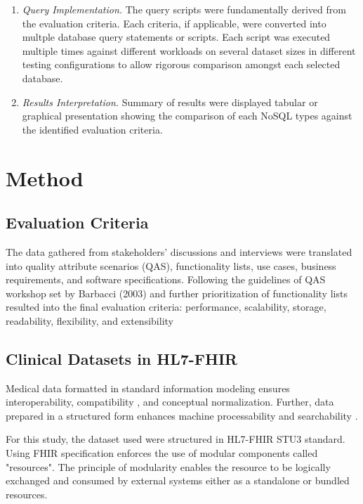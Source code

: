 \documentclass[5p]{elsarticle}
\begin{document}
\begin{enumerate}
\item \emph{Query Implementation.} 
The query scripts were fundamentally derived from the evaluation criteria. 
Each criteria, if applicable, were converted into multple database query statements or scripts.
Each script was executed multiple times against different workloads on several dataset sizes in different testing configurations to allow rigorous comparison amongst each selected database.

\item \emph{Results Interpretation.} 
Summary of results were displayed tabular or graphical presentation showing the comparison of each NoSQL types against the identified evaluation criteria.
\end{enumerate}

\section{Method}

\subsection{Evaluation Criteria}

The data gathered from stakeholders' discussions and interviews were translated into quality attribute scenarios (QAS), functionality lists, use cases, business requirements, and software specifications.
Following the guidelines of QAS workshop set by Barbacci (2003) \cite{M.R.Barbacci2003} and further prioritization of functionality lists 
resulted into the final evaluation criteria: performance, scalability, storage, readability, flexibility, and extensibility

\subsection{Clinical Datasets in HL7-FHIR}
Medical data formatted in standard information modeling ensures interoperability, compatibility \cite{K.Lee201299}, and conceptual normalization.
Further, data prepared in a structured form enhances machine processability and searchability \cite{G.Weglarz200419}.

For this study, the dataset used were structured in HL7-FHIR STU3 standard. 
Using FHIR specification enforces the use of modular components called "resources".
The principle of modularity enables the resource to be logically exchanged and consumed by external systems either as a standalone or bundled resources. 
\end{document}
